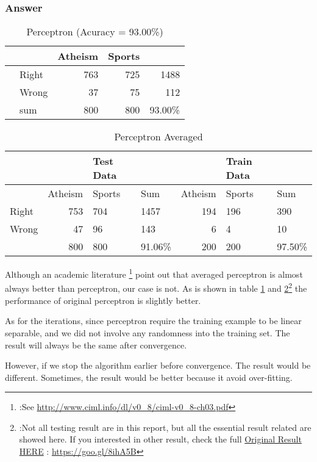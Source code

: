 \documentclass{article}
\begin{document}
\subsubsection{Answer}
\label{sec-1-2-1}

\begin{table}[htb]
\caption{\label{tab:perceptron-data}Perceptron (Acuracy = 93.00\%)}
\centering
\begin{tabular}{llrrr}
\hline
 &  & Atheism & Sports & \\
\hline
 & Right & 763 & 725 & 1488\\
 & Wrong & 37 & 75 & 112\\
\hline
 & sum & 800 & 800 & 93.00\%\\
\hline
\end{tabular}
\end{table}

\begin{table}[htb]
\caption{\label{tab:perceptron-averaged-data}Perceptron Averaged}
\centering
\begin{tabular}{l|rll|rll}
\hline
 &  & Test Data &  &  & Train Data & \\
\hline
 & Atheism & Sports & Sum & Atheism & Sports & Sum\\
\hline
Right & 753 & 704 & 1457 & 194 & 196 & 390\\
Wrong & 47 & 96 & 143 & 6 & 4 & 10\\
\hline
 & 800 & 800 & 91.06\% & 200 & 200 & 97.50\%\\
\hline
\end{tabular}
\end{table}

Although an academic literature \footnote{:See \url{http://www.ciml.info/dl/v0_8/ciml-v0_8-ch03.pdf}} point out that averaged perceptron is almost always better than perceptron, our case is not. As is shown in table \ref{tab:perceptron-data} and \ref{tab:perceptron-averaged-data}\footnote{:Not all testing result are in this report, but all the essential result related are showed here. If you interested in other result, check the full \href{https://goo.gl/8ihA5B}{Original Result HERE} : \url{https://goo.gl/8ihA5B}} the performance of original perceptron is slightly better.

As for the iterations, since perceptron require the training example to be linear separable, and we did not involve any randomness into the training set. The result will always be the same after convergence. 

However, if we stop the algorithm earlier before convergence. The result would be different. Sometimes, the result would be better because it avoid over-fitting.
\end{document}
